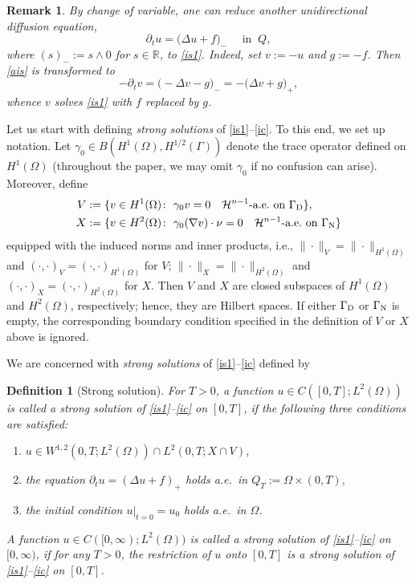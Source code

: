 \documentclass[reqno,10pt]{amsart}
\newtheorem{Def}[Th]{Definition}
\newtheorem{Rem}[Th]{Remark}
\begin{document}
\begin{Rem}
{\rm
By change of variable, one can reduce another unidirectional diffusion
 equation,
\begin{equation}\label{ais}
\partial_t u = \big( \Delta u + f \big)_- \quad \mbox{ in } \ Q,
\end{equation}
where $(s)_- := s \wedge 0$ for $s \in {{\mathbb R}}$, to \eqref{is1}. Indeed, set
 $v := -u$ and $g := -f$. Then \eqref{ais} is transformed to
$$
- \partial_t v = \big( - \Delta v - g \big)_-
= - \big( \Delta v + g \big)_+,
$$
whence $v$ solves \eqref{is1} with $f$ replaced by $g$.
}
\end{Rem}

Let us start with defining \emph{strong solutions} of
\eqref{is1}--\eqref{ic}. To this end, we set up notation.
Let $\gamma_0 \in B(H^1(\Omega), H^{1/2}(\Gamma))$ denote the trace
operator defined on $H^1(\Omega)$ (throughout the paper, we may omit
$\gamma_0$ if no confusion can arise). Moreover, define
\begin{align*}
V&:=\{v\in H^1(\Omega) \colon \ \gamma_0v=0
\quad {{\mathcal H}}^{n-1}\mbox{-a.e.~on } {{\Gamma_{\rm\scriptsize D}}}\},\\
X&:=\{v\in H^2(\Omega) \colon \ \gamma_0(\nabla v) \cdot \nu =0
\quad {{\mathcal H}}^{n-1}\mbox{-a.e.~on } {{\Gamma_{\rm\scriptsize N}}}\}
\end{align*}
equipped with the induced norms and inner products, i.e.,
$\|\cdot\|_V = \|\cdot\|_{H^1(\Omega)}$ and $(\cdot,\cdot)_V =
(\cdot, \cdot)_{H^1(\Omega)}$ for $V$; $\|\cdot\|_X =
\|\cdot\|_{H^2(\Omega)}$ and $(\cdot,\cdot)_X = (\cdot,
\cdot)_{H^2(\Omega)}$ for $X$.
Then $V$ and $X$ are closed subspaces of $H^1(\Omega)$
and $H^2(\Omega)$, respectively; hence, they are Hilbert spaces.
If either ${{\Gamma_{\rm\scriptsize D}}}$ or ${{\Gamma_{\rm\scriptsize N}}}$ is empty, the corresponding boundary
condition specified in the definition of $V$ or $X$ above is ignored.

We are concerned with \emph{strong solutions} of \eqref{is1}--\eqref{ic}
defined by

\begin{Def}[Strong solution]\label{def-ss}
For $T > 0$, a function $u \in C([0,T];L^2(\Omega))$ is called a \emph{strong
 solution} of \eqref{is1}--\eqref{ic} on $[0,T]$, if the following three
 conditions are satisfied\/{\rm :}
\begin{enumerate}[{\rm (i)}]
\item $u\in W^{1,2}(0,T;L^2(\Omega)) \cap L^2(0,T;X \cap V)$,
\item the equation $\partial_t u =(\Delta u+f)_+$ holds a.e.~in $Q_T := \Omega
	     \times (0,T)$,
\item the initial condition $u|_{t=0}=u_0$ holds a.e.~in $\Omega$.
\end{enumerate}
A function $u \in C([0,\infty);L^2(\Omega))$ is called a \emph{strong
 solution} of \eqref{is1}--\eqref{ic} on $[0,\infty)$, if for any $T> 0$, the
 restriction of $u$ onto $[0,T]$ is a strong solution
 of \eqref{is1}--\eqref{ic} on $[0,T]$.
\end{Def}
\end{document}
